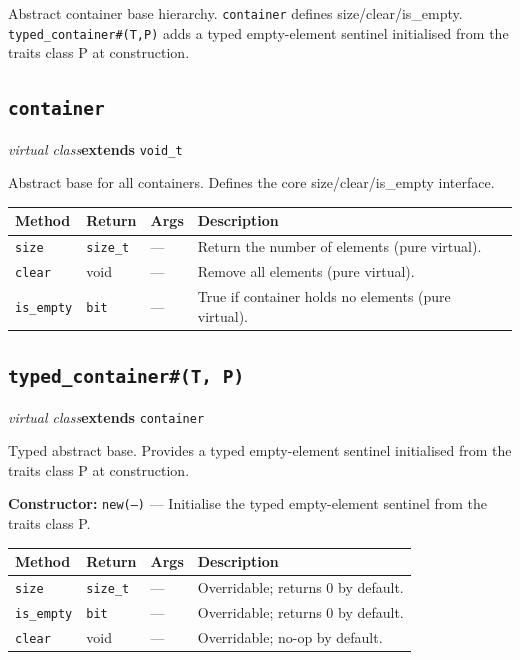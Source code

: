 \documentclass[11pt,letterpaper]{report}
\begin{document}
Abstract container base hierarchy. \texttt{container} defines size/clear/is\_empty. \texttt{typed\_container\#(T,P)} adds a typed empty-element sentinel initialised from the traits class P at construction.

\subsection*{\texttt{container}}
\noindent\small\textit{virtual class}\quad \textbf{extends} \texttt{void\_t}\par

Abstract base for all containers. Defines the core size/clear/is\_empty interface.

\begin{xltabular}{\linewidth}{>{\small}p{1.35in} >{\small}p{1.25in} >{\small}p{0.95in} >{\small}X}
\toprule
\textbf{Method} & \textbf{Return} & \textbf{Args} & \textbf{Description} \\
\midrule
\endhead
\bottomrule
\endfoot
\texttt{size} & \texttt{size\_t} & --- & Return the number of elements (pure virtual). \\
\texttt{clear} & void & --- & Remove all elements (pure virtual). \\
\texttt{is\_empty} & \texttt{bit} & --- & True if container holds no elements (pure virtual). \\
\end{xltabular}

\subsection*{\texttt{typed\_container\#(T, P)}}
\noindent\small\textit{virtual class}\quad \textbf{extends} \texttt{container}\par

Typed abstract base. Provides a typed empty-element sentinel initialised from the traits class P at construction.

\noindent\textbf{Constructor:} \texttt{new(---)} --- Initialise the typed empty-element sentinel from the traits class P.

\begin{xltabular}{\linewidth}{>{\small}p{1.35in} >{\small}p{1.25in} >{\small}p{0.95in} >{\small}X}
\toprule
\textbf{Method} & \textbf{Return} & \textbf{Args} & \textbf{Description} \\
\midrule
\endhead
\bottomrule
\endfoot
\texttt{size} & \texttt{size\_t} & --- & Overridable; returns 0 by default. \\
\texttt{is\_empty} & \texttt{bit} & --- & Overridable; returns 0 by default. \\
\texttt{clear} & void & --- & Overridable; no-op by default. \\
\end{xltabular}
\end{document}
